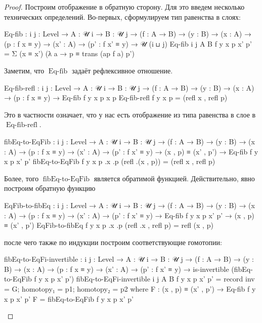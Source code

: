 \documentclass{article}[12pt]
\newcommand{\op}{\operatorname}
\begin{document}
\begin{proof}
Построим отображение в обратную сторону. Для это введем несколько технических определений.
Во-первых, сформулируем тип равенства в слоях:
\begin{code}
Eq-fib : {i j : Level} → {A : 𝒰 i} → {B : 𝒰 j}
         → (f : A → B)
         → (y : B)
         → (x : A)
         → (p : f x ≡ y)
         → (x' : A)
         → (p' : f x' ≡ y)
         → 𝒰 (i ⊔ j)
Eq-fib {i} {j} {A} {B} f y x p x' p' = Σ (x ≡ x') (λ a → p ≡ trans (ap f a) p')
\end{code}
Заметим, что $\op{Eq-fib}$ задаёт рефлексивное отношение.
\begin{code}
Eq-fib-refl : {i j : Level} → {A : 𝒰 i} → {B : 𝒰 j}
              → (f : A → B)
              → (y : B)
              → (x : A)
              → (p : f x ≡ y)
              → Eq-fib f y x p x p
Eq-fib-refl f y x p = (refl x , refl p)
\end{code}
Это в частности означает, что у нас есть отображение из типа равенства в слое в $\op{Eq-fib-refl}$.
\begin{code}
fibEq-to-EqFib : {i j : Level} → {A : 𝒰 i} → {B : 𝒰 j}
                 → (f : A → B)
                 → (y : B)
                 → (x : A) → (p : f x ≡ y)
                 → (x' : A) → (p' : f x' ≡ y)
                 → (x , p) ≡ (x' , p')
                 → Eq-fib f y x p x' p'
fibEq-to-EqFib f y x p .x .p (refl .(x , p)) = (refl x , refl p)
\end{code}
Более, того $\op{fibEq-to-EqFib}$ является обратимой функцией. Действительно, явно построим
обратную функцию
\begin{code}
EqFib-to-fibEq : {i j : Level} → {A : 𝒰 i} → {B : 𝒰 j}
                 → (f : A → B)
                 → (y : B)
                 → (x : A) → (p : f x ≡ y)
                 → (x' : A) → (p' : f x' ≡ y)
                 → Eq-fib f y x p x' p'
                 → (x , p) ≡ (x' , p')
EqFib-to-fibEq f y x p .x .p (refl .x , refl p) = refl (x , p)
\end{code}
после чего также по индукции построим соответствующие гомотопии:
\begin{code}
fibEq-to-EqFi-invertible : {i j : Level} → {A : 𝒰 i} → {B : 𝒰 j}
                           → (f : A → B)
                           → (y : B)
                           → (x : A) → (p : f x ≡ y)
                           → (x' : A) → (p' : f x' ≡ y)
                           → is-invertible (fibEq-to-EqFib f y x p x' p')
fibEq-to-EqFi-invertible {i} {j} {A} {B} f y x p x' p' = 
    record {inv = G;
            homotopy₁ = p1;
            homotopy₂ = p2}
    where
        F : (x , p) ≡ (x' , p') → Eq-fib f y x p x' p'
        F = fibEq-to-EqFib f y x p x' p'


\end{code}
\end{proof}
\end{document}
